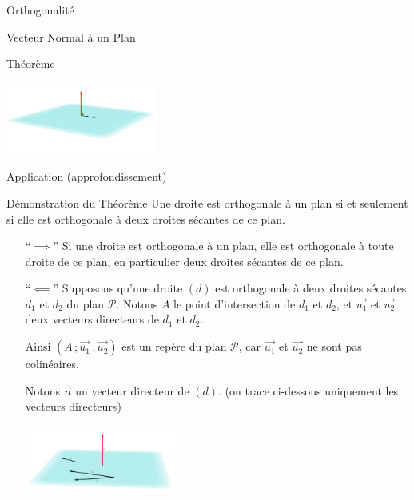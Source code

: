 \documentclass{cours}
\begin{document}
\begin{Gpartie}{Orthogonalité}
\begin{Spartie}{Vecteur Normal à un Plan}
\begin{SSpartie}{Théorème}
                \begin{center}
                    \includegraphics[width=5cm]{rsc/12fig5.png}
                    \parbox{\linewidth}{}
                \end{center}
            \end{SSpartie}
        \end{Spartie}
        \begin{Spartie}{Application (approfondissement)} 
            \begin{SSpartie}{Démonstration du Théorème} 
                \og Une droite est orthogonale à un plan si et seulement si elle est orthogonale à deux droites sécantes de ce plan. \fg
                \begin{itemize}[leftmargin=7ex]
                    \item[``$\implies$''] Si une droite est orthogonale à un plan, elle est orthogonale à toute droite de ce plan, en particulier deux droites sécantes de ce plan.
                    \item[``$\impliedby$''] Supposons qu'une droite $(d)$ est orthogonale à deux droites sécantes $d_1$ et $d_2$ du plan $\mathcal{P}$. Notons $A$ le point d'intersection de $d_1$ et $d_2$, et $\vec{u_1}$ et $\vec{u_2}$ deux vecteurs directeurs de $d_1$ et $d_2$.

                    Ainsi $\left(A\,;\vec{u_1}\,,\vec{u_2}\right)$ est un repère du plan $\mathcal{P}$, car $\vec{u_1}$ et $\vec{u_2}$ ne sont pas colinéaires.

                    Notons $\vec{n}$ un vecteur directeur de $(d)$. (on trace ci-dessous uniquement les vecteurs directeurs)
                    \vspace{-0.2ex}
                    \begin{center}
                        \includegraphics[width=5cm]{rsc/12fig6.png}
                        \parbox{\linewidth}{}
                    \end{center}
    

\end{itemize}
\end{SSpartie}
\end{Spartie}
\end{Gpartie}
\end{document}
